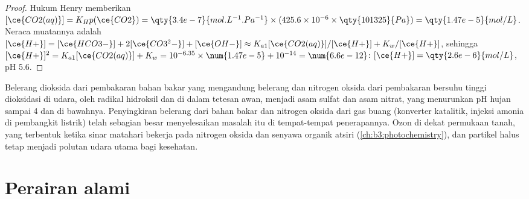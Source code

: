 \begin{proof}
Hukum Henry memberikan $[\ce{CO2(aq)}] = K_Hp(\ce{CO2}) = \qty{3.4e-7}{mol.L^{-1}.Pa^{-1}} \times (425.6 \times 10^{-6} \times \qty{101325}{Pa}) = \qty{1.47e-5}{mol/L}$.
Neraca muatannya adalah $[\ce{H+}] = [\ce{HCO3-}] + 2[\ce{CO3^2-}] + [\ce{OH-}] \approx K_{a1}[\ce{CO2(aq)}]/[\ce{H+}] + K_w/[\ce{H+}]$, sehingga
$[\ce{H+}]^2 = K_{a1}[\ce{CO2(aq)}] + K_w = 10^{-6.35} \times \num{1.47e-5} + 10^{-14} = \num{6.6e-12}$: $[\ce{H+}] = \qty{2.6e-6}{mol/L}$, pH 5.6.
\end{proof}

Belerang dioksida dari pembakaran bahan bakar yang mengandung belerang dan nitrogen oksida dari
pembakaran bersuhu tinggi dioksidasi di udara, oleh radikal hidroksil dan di dalam tetesan
awan, menjadi asam sulfat dan asam nitrat, yang menurunkan pH hujan sampai 4 dan di bawahnya.
Penyingkiran belerang dari bahan bakar dan nitrogen oksida dari gas buang (konverter
katalitik, injeksi amonia di pembangkit listrik) telah sebagian besar menyelesaikan masalah itu
di tempat-tempat penerapannya. Ozon di dekat permukaan tanah, yang terbentuk ketika sinar matahari bekerja pada
nitrogen oksida dan senyawa organik atsiri (\cref{ch:b3:photochemistry}), dan
partikel halus tetap menjadi polutan udara utama bagi kesehatan.

\section{Perairan alami}


